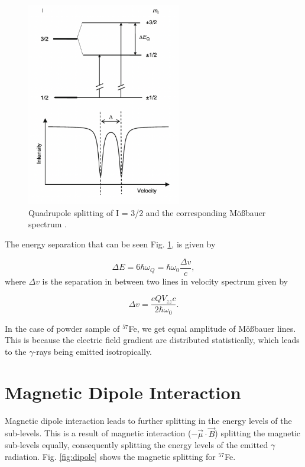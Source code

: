 \documentclass[a4paper]{report}
\numberwithin{equation}{section}
\begin{document}
\begin{figure}[htpb]
    \centering
    \includegraphics[width=0.6\textwidth]{quadrupole}
    \caption{Quadrupole splitting of I = 3/2 and the corresponding M\"o{\ss}bauer spectrum \cite{Kuzmann2011}.}
    \label{fig:quadrupole}
\end{figure}

The energy separation that can be seen Fig. \ref{fig:quadrupole}, is given by

\begin{equation}
		\Delta E = 6 \hbar \omega _{Q} = \hbar \omega _{0} \frac{\Delta v}{c},
\end{equation}
where $\Delta v$ is the separation in between two lines in velocity spectrum given by

\begin{equation}
		\Delta v = \frac{eQV_{zz}c}{2 \hbar \omega _{0}}.
\end{equation}

In the case of powder sample of $^{57}$Fe, we get equal amplitude of M\"o{\ss}bauer lines. This is because the electric field gradient are distributed statistically, which leads to the $\gamma$-rays being emitted isotropically. 

\section{Magnetic Dipole Interaction}

Magnetic dipole interaction leads to further splitting in the energy levels of the sub-levels. This is a result of magnetic interaction ($- \vec{\mu} \cdot \vec{B}$) splitting the magnetic sub-levels equally, consequently splitting the energy levels of the emitted $\gamma$ radiation. Fig. \ref{fig:dipole} shows the magnetic splitting for $^{57}$Fe. 
\end{document}
